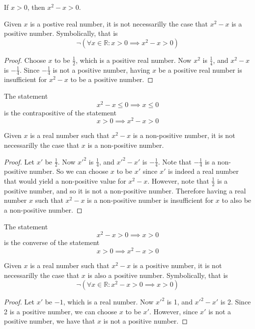\documentclass[main.tex]{subfiles}
\begin{document}
\subproblem{}\label{3b}
If \(x > 0\), then \(x^2 - x > 0\).

\begin{thm}
	Given \(x\) is a postive real number, it is not necessarilly the case
	that \(x^2 - x\) is a positive number. Symbolically, that is
	\[\neg (\forall x \in \mathbb{R}: x > 0 \implies x^2 - x > 0)\]
\end{thm}
\begin{proof}
	Choose \(x\) to be \(\frac{1}{2}\), which is a positive real number. Now
	\(x^2\) is \(\frac{1}{4}\), and \(x^2 - x\) is \(-\frac{1}{4}\). Since
	\(-\frac{1}{4}\) is not a positive number, having \(x\) be a positive
	real number is insufficient for \(x^2 - x\) to be a positive number.
\end{proof}

\begin{remark}
	The statement
	\[x^2 -x \leq 0 \implies x \leq 0\]
	is the contrapositive of the statement
	\[x > 0 \implies x^2 - x > 0\]
\end{remark}
\begin{thm}
	Given \(x\) is a real number such that \(x^2 - x\) is a non-positive
	number, it is not necessarilly the case that \(x\) is a non-positive
	number.
\end{thm}
\begin{proof}
	Let \(x'\) be \(\frac{1}{2}\). Now \(x'^2\) is \(\frac{1}{4}\), and
	\(x'^2 - x'\) is \(-\frac{1}{4}\). Note that \(-\frac{1}{4}\) is a
	non-positive number. So we can choose \(x\) to be \(x'\) since \(x'\)
	is indeed a real number that would yield a non-positive value for
	\(x^2 - x\). However, note that \(\frac{1}{2}\) is a positive number,
	and so it is not a non-positive number. Therefore having a real number
	\(x\) such that \(x^2 - x\) is a non-positive number is insufficient for
	\(x\) to also be a non-positive number.
\end{proof}

\begin{remark}
	The statement
	\[x^2 - x > 0 \implies x > 0\]
	is the converse of the statement
	\[x > 0 \implies x^2 - x > 0\]
\end{remark}
\begin{thm}
	Given \(x\) is a real number such that \(x^2 - x\) is a positive number,
	it is not necessarilly the case that \(x\) is also a positive number.
	Symbolically, that is
	\[\neg (\forall x \in \mathbb{R}: x^2 - x > 0 \implies x > 0)\]
\end{thm}
\begin{proof}
	Let \(x'\) be \(-1\), which is a real number. Now \(x'^2\) is 1, and
	\(x'^2 - x'\) is 2. Since 2 is a positive number, we can choose \(x\) to
	be \(x'\). However, since \(x'\) is not a positive number, we have that
	\(x\) is not a positive number.
\end{proof}
\end{document}

